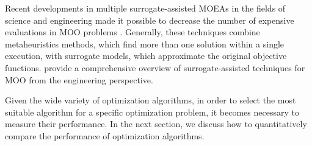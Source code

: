 	
	Recent developments in multiple surrogate-assisted \acp{MOEA} in the fields of science and engineering made it possible to decrease the number of expensive evaluations in \ac{MOO} problems \cite{Hussein2016,Zapotecas-Martinez2016}. Generally, these techniques combine metaheuristics methods, which find more than one solution within a single execution, with surrogate models, which approximate the original objective functions. \cite{Diaz-Manriquez2016} provide a comprehensive overview of surrogate-assisted techniques for \ac{MOO} from the engineering perspective. 
	
	Given the wide variety of optimization algorithms, in order to select the most suitable algorithm for a specific optimization problem, it becomes necessary to measure their performance. In the next section, we discuss how to quantitatively compare the performance of optimization algorithms.
	
	
